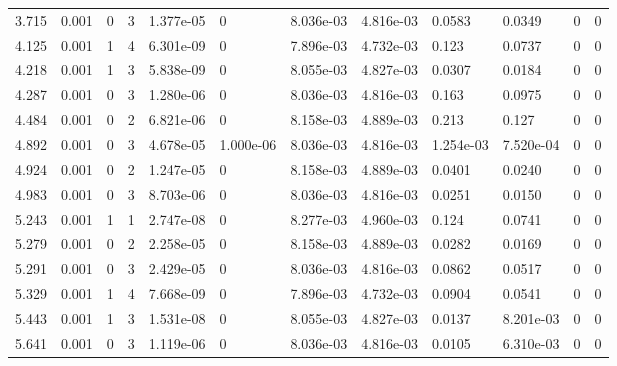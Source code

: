 \documentclass[preview]{standalone}
\begin{document}
{{\begin{tabular}{L{1.2cm}C{1.2cm} C{0.3cm}C{0.5cm} C{1.4cm}C{1.4cm} C{1.4cm}C{1.4cm} C{1.6cm}C{1.6cm} C{1.6cm}C{1.6cm}}
  3.715  &  0.001  & 0     &  3 &  1.377e-05  & 0  &  8.036e-03&   4.816e-03& 0.0583 & 0.0349   &  0 & 0  \\ 
  4.125  &  0.001  & 1     &  4 &  6.301e-09  & 0  &  7.896e-03&   4.732e-03& 0.123 & 0.0737   &  0 & 0  \\ 
  4.218  &  0.001  & 1     &  3 &  5.838e-09  & 0  &  8.055e-03&   4.827e-03& 0.0307 & 0.0184   &  0 & 0  \\ 
  4.287  &  0.001  & 0     &  3 &  1.280e-06  & 0  &  8.036e-03&   4.816e-03& 0.163 & 0.0975   &  0 & 0  \\ 
  4.484  &  0.001  & 0     &  2 &  6.821e-06  & 0  &  8.158e-03&   4.889e-03& 0.213 & 0.127   &  0 & 0  \\ 
  4.892  &  0.001  & 0     &  3 &  4.678e-05  & 1.000e-06  &  8.036e-03&   4.816e-03& 1.254e-03 & 7.520e-04   &  0 & 0  \\ 
  4.924  &  0.001  & 0     &  2 &  1.247e-05  & 0  &  8.158e-03&   4.889e-03& 0.0401 & 0.0240   &  0 & 0  \\ 
  4.983  &  0.001  & 0     &  3 &  8.703e-06  & 0  &  8.036e-03&   4.816e-03& 0.0251 & 0.0150   &  0 & 0  \\ 
  5.243  &  0.001  & 1     &  1 &  2.747e-08  & 0  &  8.277e-03&   4.960e-03& 0.124 & 0.0741   &  0 & 0  \\ 
  5.279  &  0.001  & 0     &  2 &  2.258e-05  & 0  &  8.158e-03&   4.889e-03& 0.0282 & 0.0169   &  0 & 0  \\ 
  5.291  &  0.001  & 0     &  3 &  2.429e-05  & 0  &  8.036e-03&   4.816e-03& 0.0862 & 0.0517   &  0 & 0  \\ 
  5.329  &  0.001  & 1     &  4 &  7.668e-09  & 0  &  7.896e-03&   4.732e-03& 0.0904 & 0.0541   &  0 & 0  \\ 
  5.443  &  0.001  & 1     &  3 &  1.531e-08  & 0  &  8.055e-03&   4.827e-03& 0.0137 & 8.201e-03   &  0 & 0  \\ 
  5.641  &  0.001  & 0     &  3 &  1.119e-06  & 0  &  8.036e-03&   4.816e-03& 0.0105 & 6.310e-03   &  0 & 0  \\ 
\hline 
\end{tabular} 

}}
\end{document}
